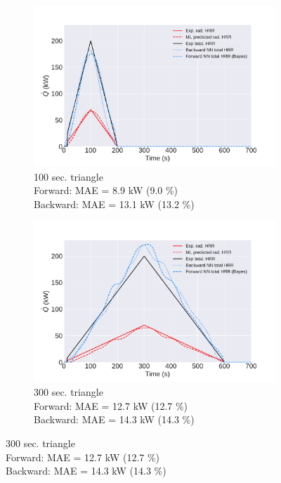\documentclass{article}
\begin{document}
\begin{figure}[htbp]
  \centering
  \begin{subfigure}[t]{.45\textwidth}
      \centering
      \includegraphics[width=\textwidth,keepaspectratio]{figures/100s_triangle_final.pdf}
      \caption{100 sec. triangle \\ Forward: MAE = 8.9 kW (9.0 \%) \\ Backward: MAE = 13.1 kW (13.2 \%)}
      \label{fig:final_result_100s_triangle}
  \end{subfigure}
  \begin{subfigure}[t]{.45\textwidth}
      \centering
      \includegraphics[width=\textwidth ,keepaspectratio]{figures/300s_triangle_final.pdf}
      \caption{300 sec. triangle \\ Forward: MAE = 12.7 kW (12.7 \%) \\ Backward: MAE = 14.3 kW (14.3 \%)}
      \label{fig:final_result_300s_triangle}

\end{subfigure}
\end{figure}
\end{document}
